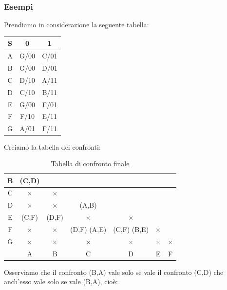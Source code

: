 \documentclass[a4paper]{article}
\theoremstyle{break}
\theoremstyle{break}
\theoremstyle{break}
\theoremstyle{break}
\begin{document}
\subsubsection{Esempi}
  \begin{example}
    Prendiamo in considerazione la seguente tabella:
    \begin{table}[H]
      \begin{center}
        \begin{tabular}{c|c|c}
          S & 0 & 1 \\
          \hline
          A & G/00 & C/01 \\
          B & G/00 & D/01 \\
          C & D/10 & A/11 \\
          D & C/10 & B/11 \\
          E & G/00 & F/01 \\
          F & F/10 & E/11 \\
          G & A/01 & F/11 \\
        \end{tabular}
      \end{center}
    \end{table}
    Creiamo la tabella dei confronti:
    \begin{table}[H]
  \begin{center}
    \begin{tabular}{c|c|c|c|c|c|c}
      B & (C,D) &  &  &  &  & \\
      \hline
      C & \( \times  \)  & \( \times \)  &  &  &  &  \\
      \hline
      D & \( \times  \)  & \( \times  \)  & (A,B) &  &  &  \\
      \hline
      E & (C,F) & (D,F) & \( \times \)  & \( \times  \) &  &   \\
      \hline
      F & \( \times  \)  & \( \times  \)  & (D,F) (A,E)  & (C,F) (B,E) & \( \times  \)  & \\
      \hline
      G & \( \times  \)  & \( \times  \)  & \( \times  \)  & \( \times  \) & \( \times  \)  & \( \times  \)  \\
      \hline
        & A & B & C & D & E & F \\
    \end{tabular}
  \end{center}
  \caption{Tabella di confronto finale}
\end{table}
    Osserviamo che il confronto (B,A) vale solo se vale il confronto (C,D) che anch'esso
    vale solo se vale (B,A), cioè:

\end{example}
\end{document}
